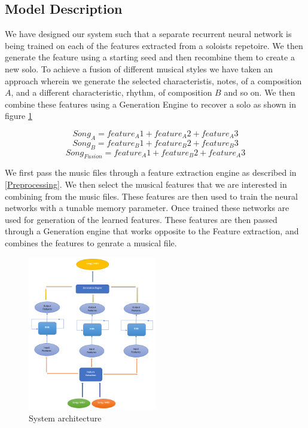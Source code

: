 \documentclass[conference]{IEEEtran}
\begin{document}
\subsection{Model Description} \label{Model description}
We have designed our system such that a separate recurrent neural network is being trained on each of the features extracted from a soloists repetoire. We then generate the feature using a starting seed and then recombine them to create a new solo. To achieve a fusion of different musical styles we have taken an approach wherein we generate the selected characteristis, notes, of a composition $A$, and a different characteristic, rhythm, of composition $B$ and so on. We then combine these features using a Generation Engine to recover a solo as shown in figure \ref{fig:figure9}

$$ Song_A = feature_A{1} + feature_A{2} + feature_A{3}$$
$$ Song_B = feature_B{1} + feature_B{2} + feature_B{3}$$
$$ Song_{Fusion} = feature_A{1} + feature_B{2} + feature_A{3}$$

We first pass the music files through a feature extraction engine as described in \ref{Preprocessing}. We then select the musical features that we are interested in combining from the music files. These features are then used to train the neural networks with a tunable memory parameter. Once trained these networks are used for generation of the learned features. These features are then passed through a Generation engine that works opposite to the Feature extraction, and combines the features to genrate a musical file.

\begin{figure}[h]
\includegraphics[width=0.5\textwidth]{IEEEtran/2.PNG}
\caption{System architecture}
\label{fig:figure9}
\end{figure}
\end{document}
